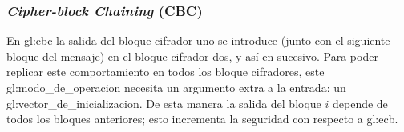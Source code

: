 %
%

\subsubsection{\textit{Cipher-block Chaining} (CBC)}

En \acrshort{gl:cbc} la salida del bloque cifrador uno se introduce (junto con
el siguiente bloque del mensaje) en el bloque cifrador dos, y así en sucesivo.
Para poder replicar este comportamiento en todos los bloque cifradores, este
\gls{gl:modo_de_operacion} necesita un argumento extra a la entrada: un
\gls{gl:vector_de_inicializacion}. De esta manera la salida del bloque $ i $
depende de todos los bloques anteriores; esto incrementa la seguridad con
respecto a \acrshort{gl:ecb}.

